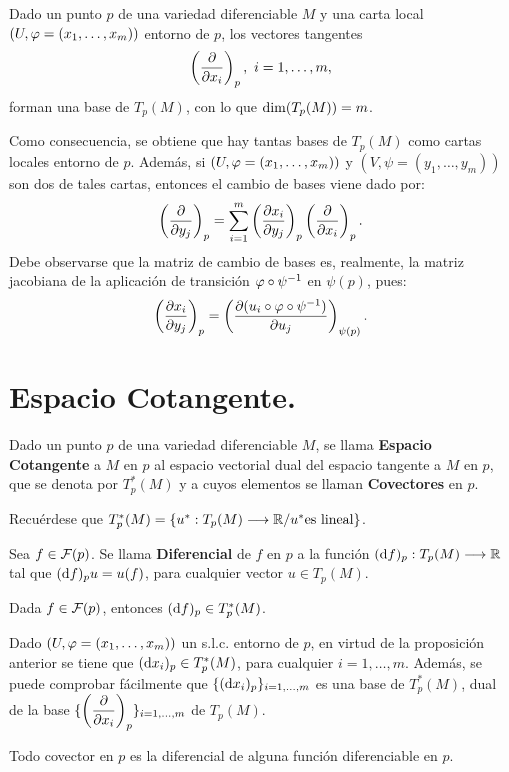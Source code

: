 \documentclass[cursovd_portada.tex]{subfiles}
\begin{document}
\begin{teorema}
Dado un punto $p$ de una variedad diferenciable $M$ y una carta local $(U,\varphi=(x_1,\dots ,x_m))$ entorno de $p$,
los vectores tangentes
$$\left(\displaystyle{\frac{\partial}{\partial x_i}}\right)_p,\mbox{ }i=1,\dots ,m,$$
forman una base de $T_p(M)$, con lo que ${\rm dim}(T_p(M))=m$.
\end{teorema}
Como consecuencia, se obtiene que hay tantas bases de $T_p(M)$ como cartas locales entorno de $p$. Además, si
$(U,\varphi=(x_1,\dots ,x_m))$ y $(V,\psi=(y_1,\dots ,y_m))$ son dos de tales cartas, entonces el cambio de bases
viene dado por:
$$\left( \displaystyle{\frac{\partial}{\partial y_j}}\right)_p=\sum_{i=1}^m\left(\displaystyle{\frac{\partial x_i}{\partial y_j}}\right)_p\left( \displaystyle{\frac{\partial}{\partial x_i}}\right)_p.$$
\hs Debe observarse que la matriz de cambio de bases es, realmente, la matriz jacobiana de la aplicación de
transición $\varphi\circ\psi^{-1}$ en $\psi(p)$, pues:
$$\left(\displaystyle{\frac{\partial x_i}{\partial y_j}}\right)_p=\left(\displaystyle{\frac{\partial (u_i\circ\varphi\circ\psi^{-1})}{\partial u_j}}\right)_{\psi(p)}.$$
\section{Espacio Cotangente.}
\begin{defi}
Dado un punto $p$ de una variedad diferenciable $M$, se llama {\bf Espacio Cotangente} a $M$ en $p$ al espacio
vectorial dual del espacio tangente a $M$ en $p$, que se denota por $T_p^*(M)$ y a cuyos elementos se llaman {\bf
Covectores} en $p$.
\end{defi}
Recuérdese que $T_p^*(M)=\{u^*:T_p(M)\longrightarrow\mathbb{R} /u^* {\rm es}\mbox{ }{\rm lineal}\}$.
\begin{defi}
Sea $f\in{\cal F}(p)$. Se llama {\bf Diferencial} de $f$ en $p$ a la función $({\rm d} f)_p:T_p(M)\longrightarrow\mathbb{R}$ tal que
$({\rm d} f)_pu=u(f)$, para cualquier vector $u\in T_p(M)$.
\end{defi}
\begin{prop}
Dada $f\in{\cal F}(p)$, entonces $({\rm d} f)_p\in T_p^*(M)$.
\end{prop}
Dado $(U,\varphi=(x_1,\dots ,x_m))$ un s.l.c. entorno de $p$, en virtud de la proposición anterior se tiene que
$({\rm d} x_i)_p\in T_p^*(M)$, para cualquier $i=1,\dots ,m$. Además, se puede comprobar fácilmente que
$\{({\rm d} x_i)_p\}_{i=1,\dots ,m}$ es una base de $T_p^*(M)$, dual de la base
$\{\left(\displaystyle{\frac{\partial}{\partial x_i}}\right)_p\}_{i=1,\dots ,m}$ de $T_p(M)$.
\begin{prop}
Todo covector en $p$ es la diferencial de alguna función diferenciable en $p$.
\end{prop}

\newpage
\end{document}

